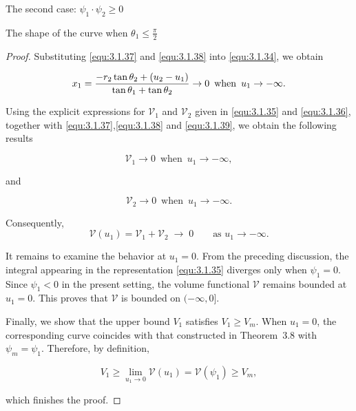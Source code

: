 \documentclass[letterpaper,reqno,10pt,twoside]{amsart}
\theoremstyle{definition}
\theoremstyle{remark}
\begin{document}
\begin{section}{The second case: $\psi_1\cdot \psi_2\geq 0$ }
\begin{subsection}{The shape of the curve when $\theta_1\leq \frac{\pi}{2}$}
\begin{proof}
            \noindent Substituting \eqref{equ:3.1.37} and \eqref{equ:3.1.38} into \eqref{equ:3.1.34}, we obtain

            \begin{equation}{\label{equ:3.1.39}}
                x_1=\frac{-r_2\tan\theta_2+(u_2-u_1)}{\tan\theta_1+\tan\theta_2}\rightarrow 0~\operatorname{when}~u_1\rightarrow -\infty.
            \end{equation}

             Using the explicit expressions for $\mathscr{V}_1$ and $\mathscr{V}_2$ given in \eqref{equ:3.1.35} and \eqref{equ:3.1.36}, together with \eqref{equ:3.1.37},\eqref{equ:3.1.38} and \eqref{equ:3.1.39}, we obtain the following results
            
            \begin{equation*}
                \mathscr{V}_1\rightarrow 0~\operatorname{when}~u_1\rightarrow -\infty,
            \end{equation*}

            \noindent and

            \begin{equation*}
                 \mathscr{V}_2\rightarrow 0~\operatorname{when}~u_1\rightarrow -\infty.
            \end{equation*}

            \noindent Consequently,
\[
\mathscr{V}(u_1)=\mathscr{V}_1+\mathscr{V}_2 \;\longrightarrow\; 0
\qquad \text{as } u_1\to -\infty .
\]

It remains to examine the behavior at $u_1=0$. From the preceding discussion, the integral appearing in the representation \eqref{equ:3.1.35} diverges only when $\psi_1=0$. Since $\psi_1<0$ in the present setting, the volume functional $\mathscr{V}$ remains bounded at $u_1=0$. This proves that $\mathscr{V}$ is bounded on $(-\infty,0]$.

             Finally, we show that the upper bound $V_1$ satisfies $V_{1}\geq V_m$. When $u_1=0$, the corresponding curve coincides with that constructed in Theorem~3.8 with $\psi_m=\psi_1$. Therefore, by definition,

            \begin{equation*}
                V_1\geq \lim_{u_1\rightarrow 0} {\mathscr{V}}(u_1)={\mathscr{V}}(\psi_1)\geq V_m,
            \end{equation*}

            \noindent which finishes the proof.
        \end{proof}


\end{subsection}
\end{section}
\end{document}
